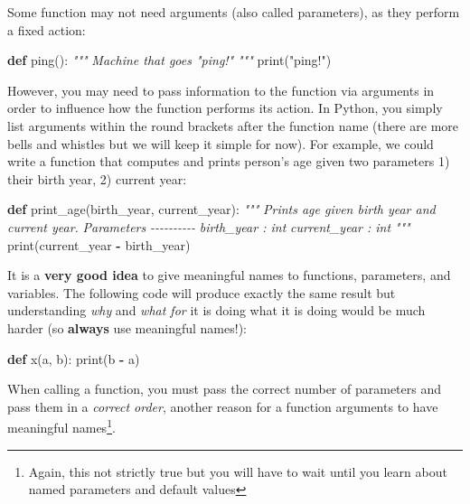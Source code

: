 \documentclass[
]{book}
\newenvironment{Shaded}{\begin{snugshade}}{\end{snugshade}}
\newcommand{\BuiltInTok}[1]{#1}
\newcommand{\CommentTok}[1]{\textcolor[rgb]{0.56,0.35,0.01}{\textit{#1}}}
\newcommand{\KeywordTok}[1]{\textcolor[rgb]{0.13,0.29,0.53}{\textbf{#1}}}
\newcommand{\NormalTok}[1]{#1}
\newcommand{\OperatorTok}[1]{\textcolor[rgb]{0.81,0.36,0.00}{\textbf{#1}}}
\newcommand{\StringTok}[1]{\textcolor[rgb]{0.31,0.60,0.02}{#1}}
\begin{document}
Some function may not need arguments (also called parameters), as they perform a fixed action:

\begin{Shaded}
\begin{Highlighting}[]
\KeywordTok{def}\NormalTok{ ping():}
    \CommentTok{"""}
\CommentTok{    Machine that goes "ping!"}
\CommentTok{    """}
    \BuiltInTok{print}\NormalTok{(}\StringTok{"ping!"}\NormalTok{)}
\end{Highlighting}
\end{Shaded}

However, you may need to pass information to the function via arguments in order to influence how the function performs its action. In Python, you simply list arguments within the round brackets after the function name (there are more bells and whistles but we will keep it simple for now). For example, we could write a function that computes and prints person's age given two parameters 1) their birth year, 2) current year:

\begin{Shaded}
\begin{Highlighting}[]
\KeywordTok{def}\NormalTok{ print\_age(birth\_year, current\_year):}
    \CommentTok{"""}
\CommentTok{    Prints age given birth year and current year.}
\CommentTok{    }
\CommentTok{    Parameters}
\CommentTok{    {-}{-}{-}{-}{-}{-}{-}{-}{-}{-}}
\CommentTok{    birth\_year : int}
\CommentTok{    current\_year : int}
\CommentTok{    """}
    \BuiltInTok{print}\NormalTok{(current\_year }\OperatorTok{{-}}\NormalTok{ birth\_year)}
\end{Highlighting}
\end{Shaded}

It is a \textbf{very good idea} to give meaningful names to functions, parameters, and variables. The following code will produce exactly the same result but understanding \emph{why} and \emph{what for} it is doing what it is doing would be much harder (so \textbf{always} use meaningful names!):

\begin{Shaded}
\begin{Highlighting}[]
\KeywordTok{def}\NormalTok{ x(a, b):}
    \BuiltInTok{print}\NormalTok{(b }\OperatorTok{{-}}\NormalTok{ a)}
\end{Highlighting}
\end{Shaded}

When calling a function, you must pass the correct number of parameters and pass them in a \emph{correct order}, another reason for a function arguments to have meaningful names\footnote{Again, this not strictly true but you will have to wait until you learn about named parameters and default values}.
\end{document}
